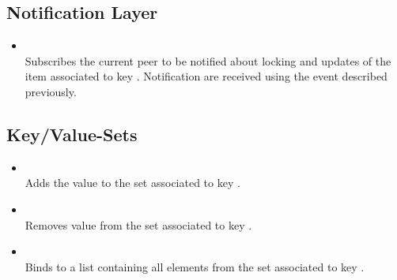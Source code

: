 \documentclass[11pt]{article}
\begin{document}
\subsection{Notification Layer}

\begin{itemize}

\item {}\\ Subscribes the current peer to be notified
about locking and updates of the item associated to key .
Notification are received using the  event described previously.

\end{itemize}

\subsection{Key/Value-Sets}

\begin{itemize}

\item {}\\ Adds the value  to the set associated to
key .

\item {}\\ Removes value  from the set associated
to key .

\item {}\\ Binds  to a list containing all
elements from the set associated to key . 

\end{itemize}
\end{document}
